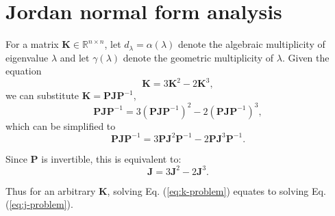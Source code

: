 \documentclass{article}
\theoremstyle{plain}
\theoremstyle{definition}
\theoremstyle{remark}
\newcommand{\vJ}{\mathbf{J}}
\newcommand{\vK}{\mathbf{K}}
\newcommand{\vP}{\mathbf{P}}
\begin{document}
\newpage
\section{Jordan normal form analysis}
\label{app:jordan}
For a matrix $\vK \in \mathbb{R}^{n \times n}$, let ${d_\lambda = \alpha(\lambda)}$ denote the algebraic multiplicity of eigenvalue $\lambda$ and let $\gamma(\lambda)$ denote the geometric multiplicity of $\lambda$. Given the equation
\begin{equation}
    \vK = 3\vK^2 - 2\vK^3,
    \label{eq:k-problem}
\end{equation}
we can substitute $\vK = \vP\vJ\vP^{-1}$,
\begin{equation}
    \vP\vJ\vP^{-1} = 3(\vP\vJ\vP^{-1})^2 - 2(\vP\vJ\vP^{-1})^3,
\end{equation}
which can be simplified to
\begin{equation}
    \vP\vJ\vP^{-1} = 3\vP\vJ^2\vP^{-1} - 2\vP\vJ^3\vP^{-1}.
\end{equation}

Since $\vP$ is invertible, this is equivalent to:
\begin{equation}
    \vJ = 3\vJ^2 - 2\vJ^3.
    \label{eq:j-problem}
\end{equation}

Thus for an arbitrary $\vK$, solving Eq. (\ref{eq:k-problem}) equates to solving Eq. (\ref{eq:j-problem}).
\end{document}
